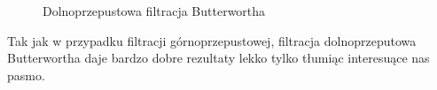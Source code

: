 \documentclass[12pt,titlepage]{report}
\begin{document}
\begin{figure}[!h]
	\centering
	\caption{Dolnoprzepustowa filtracja Butterwortha}
\end{figure}
Tak jak w przypadku filtracji górnoprzepustowej, filtracja dolnoprzeputowa Butterwortha daje bardzo dobre rezultaty lekko tylko tłumiąc interesuące nas pasmo.
\end{document}
